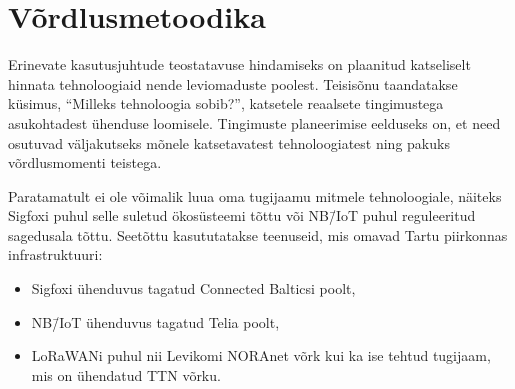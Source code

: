 \documentclass[12pt]{article}
\begin{document}
    \newpage

    \section{Võrdlusmetoodika}

    Erinevate kasutusjuhtude teostatavuse hindamiseks on plaanitud katseliselt hinnata tehnoloogiaid nende leviomaduste poolest.
    Teisisõnu taandatakse küsimus, "`Milleks tehnoloogia sobib?"', katsetele reaalsete tingimustega asukohtadest ühenduse loomisele.
    Tingimuste planeerimise eelduseks on, et need osutuvad väljakutseks mõnele katsetavatest tehnoloogiatest ning pakuks võrdlusmomenti teistega.

    Paratamatult ei ole võimalik luua oma tugijaamu mitmele tehnoloogiale, näiteks Sigfoxi puhul selle suletud ökosüsteemi tõttu või NB\=/IoT puhul reguleeritud sagedusala tõttu.
    Seetõttu kasututatakse teenuseid, mis omavad Tartu piirkonnas infrastruktuuri:
    \begin{itemize}
        \item Sigfoxi ühenduvus tagatud Connected Balticsi poolt,
        \item NB\=/IoT ühenduvus tagatud Telia poolt,
        \item LoRaWANi puhul nii Levikomi NORAnet võrk kui ka ise tehtud tugijaam, mis on ühendatud TTN võrku.
    \end{itemize}
\end{document}
